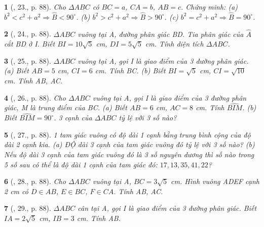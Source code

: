 \documentclass{article}
\newtheorem{baitoan}{}
\begin{document}
\begin{baitoan}[\cite{Binh_Toan_9_tap_1}, 23., p. 88]
	Cho $\Delta ABC$ có $BC = a$, $CA = b$, $AB = c$. Chứng minh: (a) $b^2 < c^2 + a^2\Rightarrow\widehat{B} < 90^\circ$. (b) $b^2 > c^2 + a^2\Rightarrow\widehat{B} > 90^\circ$. (c) $b^2 = c^2 + a^2\Rightarrow\widehat{B} = 90^\circ$.
\end{baitoan}

\begin{baitoan}[\cite{Binh_Toan_9_tap_1}, 24., p. 88]
	$\Delta ABC$ vuông tại A, đường phân giác BD. Tia phân giác của $\widehat{A}$ cắt BD ở I. Biết $BI = 10\sqrt{5}$ {\rm cm}, $DI = 5\sqrt{5}$ {\rm cm}. Tính diện tích $\Delta ABC$.
\end{baitoan}

\begin{baitoan}[\cite{Binh_Toan_9_tap_1}, 25., p. 88]
	$\Delta ABC$ vuông tại A, gọi I là giao điểm của 3 đường phân giác. (a) Biết $AB = 5$ {\rm cm}, $CI = 6$ {\rm cm}. Tính BC. (b) Biết $BI = \sqrt{5}$ {\rm cm}, $CI = \sqrt{10}$ {\rm cm}. Tính AB, AC.
\end{baitoan}

\begin{baitoan}[\cite{Binh_Toan_9_tap_1}, 26., p. 88]
	Cho $\Delta ABC$ vuông tại A, gọi I là giao điểm của 3 đường phân giác, M là trung điểm của BC. (a) Biết $AB = 6$ {\rm cm}, $AC = 8$ {\rm cm}. Tính $\widehat{BIM}$. (b) Biết $\widehat{BIM} = 90^\circ$. 3 cạnh của $\Delta ABC$ tỷ lệ với 3 số nào?
\end{baitoan}

\begin{baitoan}[\cite{Binh_Toan_9_tap_1}, 27., p. 88]
	1 tam giác vuông có độ dài 1 cạnh bằng trung bình cộng của độ dài 2 cạnh kia. (a) ĐỘ dài 3 cạnh của tam giác vuông đó tỷ lệ với 3 số nào? (b) Nếu độ dài 3 cạnh của tam giác vuông đó là 3 số nguyên dương thì số nào trong 5 số sau có thể là độ dài 1 cạnh của tam giác đó: $17,13,35,41,22$?
\end{baitoan}

\begin{baitoan}[\cite{Binh_Toan_9_tap_1}, 28., p. 88]
	Cho $\Delta ABC$ vuông tại A, $BC = 3\sqrt{5}$ {\rm cm}. Hình vuông ADEF cạnh {\rm2 cm} có $D\in AB$, $E\in BC$, $F\in CA$. Tính AB, AC.
\end{baitoan}

\begin{baitoan}[\cite{Binh_Toan_9_tap_1}, 29., p. 88]
	$\Delta ABC$ cân tại A, gọi I là giao điểm của 3 đường phân giác. Biết $IA = 2\sqrt{5}$ {\rm cm}, $IB = 3$ {\rm cm}. Tính AB.
\end{baitoan}
\end{document}
